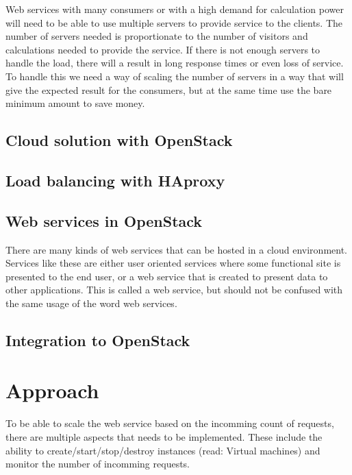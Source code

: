 Web services with many consumers or with a high demand for calculation power
will need to be able to use multiple servers to provide service to the clients.
The number of servers needed is proportionate to the number of visitors and
calculations needed to provide the service. If there is not enough servers to
handle the load, there will a result in long response times or even loss of
service.\\

To handle this we need a way of scaling the number of servers in a way that
will give the expected result for the consumers, but at the same time use the
bare minimum amount to save money.\\


\subsection{Cloud solution with OpenStack}

\subsection{Load balancing with HAproxy}




\subsection{Web services in OpenStack}
There are many kinds of web services that can be hosted in a cloud environment.
Services like these are either user oriented services where some functional
site is presented to the end user, or a web service that is created to present
data to other applications. This is called a web service, but should not be
confused with the same usage of the word web services.

\subsection{Integration to OpenStack}

\section{Approach}
To be able to scale the web service based on the incomming count of requests,
there are multiple aspects that needs to be implemented. These include the
ability to create/start/stop/destroy instances (read: Virtual machines) and
monitor the number of incomming requests.

